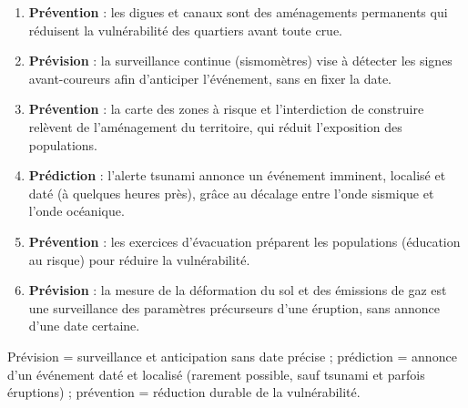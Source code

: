 \documentclass[11pt]{article}
\begin{document}
\begin{corrige}
\begin{enumerate}
\item \textbf{Prévention} : les digues et canaux sont des aménagements permanents qui réduisent la vulnérabilité des quartiers avant toute crue.
\item \textbf{Prévision} : la surveillance continue (sismomètres) vise à détecter les signes avant-coureurs afin d'anticiper l'événement, sans en fixer la date.
\item \textbf{Prévention} : la carte des zones à risque et l'interdiction de construire relèvent de l'aménagement du territoire, qui réduit l'exposition des populations.
\item \textbf{Prédiction} : l'alerte tsunami annonce un événement imminent, localisé et daté (à quelques heures près), grâce au décalage entre l'onde sismique et l'onde océanique.
\item \textbf{Prévention} : les exercices d'évacuation préparent les populations (éducation au risque) pour réduire la vulnérabilité.
\item \textbf{Prévision} : la mesure de la déformation du sol et des émissions de gaz est une surveillance des paramètres précurseurs d'une éruption, sans annonce d'une date certaine.
\end{enumerate}
\end{corrige}

\begin{attention}
Prévision = surveillance et anticipation sans date précise ; prédiction = annonce d'un événement daté et localisé (rarement possible, sauf tsunami et parfois éruptions) ; prévention = réduction durable de la vulnérabilité.
\end{attention}
\end{document}
